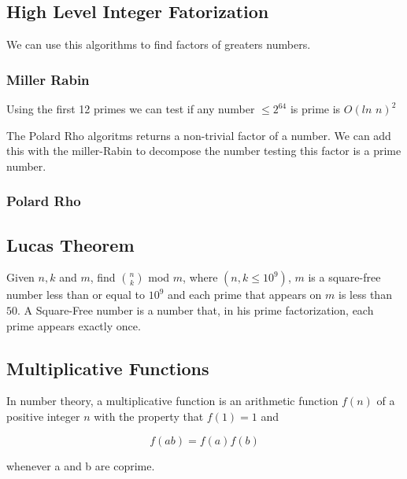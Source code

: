     \subsection{High Level Integer Fatorization}
    We can use this algorithms to find factors of greaters numbers.
    \subsubsection{Miller Rabin}

    Using the first 12 primes we can test if any number $\le 2^{64}$ is prime is $O(ln \textit{ n} )^2$
    

    The Polard Rho algoritms returns a non-trivial factor of a number. We can add this with the miller-Rabin to decompose the number testing this factor is a prime number.
    
    \subsubsection{Polard Rho}

    \subsection{Lucas Theorem}

    Given $n, k$ and $m$, find $\binom{n}{k}$ mod $m$, where $(n, k \le 10^{9})$, $m$ is a square-free number less than or equal to $10^{9}$ and each prime that appears on $m$ is less than $50$. A Square-Free number is a number that, in his prime factorization, each prime appears exactly once.

    

    \subsection{Multiplicative Functions}
   In number theory, a multiplicative function is an arithmetic function $f(n)$ of a positive integer $n$ with the property that $f(1) = 1$ and

$$\displaystyle f(ab)=f(a)f(b)$$

whenever a and b are coprime.

